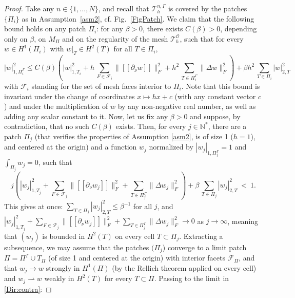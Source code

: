 \documentclass[11pt,a4paper]{article}
\theoremstyle{plain}
\theoremstyle{definition}
\theoremstyle{remark}
\numberwithin{equation}{section}
\begin{document}
\begin{proof}
	Take any $n\in\{1,\ldots,N\}$, and recall that $\mathcal{T}_h^{n,\Gamma}$ is covered by the patches $\{\Pi_i\}$ as in Assumption~\ref{asm2}, cf. Fig.~\ref{FigPatch}. We claim that the following bound holds on any patch $\Pi_i$: for any $\beta>0$, there exists $C(\beta)>0$, 	depending only on $\beta$, on $M_\Pi$ and on the regularity of the mesh 	$\mathcal{T}_h^{\mathcal{O}}$, such that for every	$w\in H^1(\Pi_i)$ with $w|_T\in H^2(T)$ for all $T\in\Pi_i$,
	\begin{equation}\label{Dir:beta}
		|w|_{1,\Pi_i^{\Gamma}}^2 \leqslant C(\beta)\left(
		|w|_{1,T_{i}}^2
		+ h\,\sum_{F\in\mathcal{F}_i}\big\| [\![ \partial_\nu w ]\!] \big\|_{F}^2
		+ h^2\,\sum_{T\in\Pi_i^{\Gamma}}\|\Delta w\|_{F}^2 \right)
		+ \beta h^2 \,\sum_{T\in\Pi_i}|w|_{2,T}^2 
	\end{equation}
with $\mathcal{F}_i$ standing for the set of mesh faces interior to $\Pi_i$. Note that this bound is invariant under the change of coordinates $x\mapsto hx+c$ (with any constant vector $c$) and under the multiplication of $w$ by any non-negative real number, as well as adding any scalar constant to it. Now, let us fix any $\beta>0$ and suppose, by contradiction, that no such $C(\beta)$ exists.
Then, for every $j\in\mathbb{N}^*$, there are a patch $\Pi_j$ (that verifies the properties of Assumption \ref{asm2},  is of size 1 ($h=1$), and centered at the origin) and a function $w_j$ normalized by $|w_j|_{1,\Pi_j^\Gamma}=1$ and $\int_{\Pi_j}w_j=0$, such that
\begin{equation}\label{Dir:contra}
	j\left(|w_j|_{1,T_{j}}^2
	+ \sum_{F\in\mathcal{F}_j}\big\| [\![ \partial_\nu w_j ]\!]\big\|_{F}^2
	+ \sum_{T\in\Pi_j^{\Gamma}}\|\Delta w_j\|_{F}^2 \right)
	+ \beta\,\sum_{T\in\Pi_j}|w_j|_{2,T}^2 \ <\ 1 .
\end{equation}
This gives at once: $\sum_{T\in\Pi_j}|w_j|_{2,T}^2\leqslant \beta^{-1}$ for all $j$, and $|w_j|_{1,T_{j}}^2
+ \sum_{F\in\mathcal{F}_j}\big\| [\![ \partial_\nu w_j ]\!]\big\|_{F}^2
+ \sum_{T\in\Pi_j^{\Gamma}}\|\Delta w_j\|_{F}^2 \longrightarrow 0$ as $j\to\infty$, meaning that $(w_j)$ is bounded in $H^2(T)$ on every cell $T\subset\Pi_j$. Extracting a subsequence, we may assume
that the patches $(\Pi_j$) converge to a limit patch $\Pi=\Pi^\Gamma\cup T_\Pi$ (of size 1 and centered at the origin) with interior facets $\mathcal{F}_\Pi$, and that $w_j\to w$ strongly in $H^1(\Pi)$ (by the Rellich theorem applied on every cell) and $w_j\rightharpoonup w$ weakly in $H^2(T)$ for every  $T\subset\Pi$.
Passing to the limit in \eqref{Dir:contra}:

\end{proof}
\end{document}
